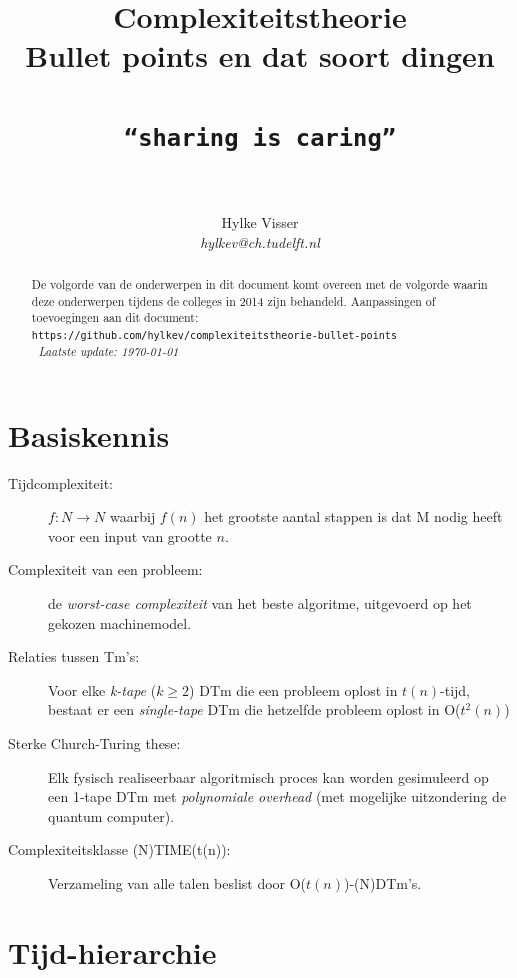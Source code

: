 \documentclass[]{article}
\begin{document}
\title{\textbf{Complexiteitstheorie} \\ Bullet points en dat soort dingen \\ ~ \\ \texttt{``sharing is caring''} \\ ~}
\author{Hylke Visser \\ \textit{hylkev@ch.tudelft.nl}}
\date{}
\maketitle

\renewcommand{\abstractname}{}

\begin{abstract}
De volgorde van de onderwerpen in dit document komt overeen met de volgorde waarin deze onderwerpen tijdens de colleges in 2014 zijn behandeld. Aanpassingen of toevoegingen aan dit document: \texttt{https://github.com/hylkev/complexiteitstheorie-bullet-points} \\ $~$ \hfill \textit{Laatste update: \today}
\end{abstract}

\section*{Basiskennis}

\begin{description}
\item[Tijdcomplexiteit:] $f : N \rightarrow N$ waarbij $f(n)$ het grootste aantal stappen is dat M nodig heeft voor een input van grootte $n$.
\item[Complexiteit van een probleem:] de \textit{worst-case complexiteit} van het beste algoritme, uitgevoerd op het gekozen machinemodel.
\item[Relaties tussen Tm's:] Voor elke \textit{k-tape} ($k \geq 2$) DTm die een probleem oplost in $t(n)$-tijd, bestaat er een \textit{single-tape} DTm die hetzelfde probleem oplost in O($t^2(n)$)
\item[Sterke Church-Turing these:] Elk fysisch realiseerbaar algoritmisch proces kan worden gesimuleerd op een 1-tape DTm met \textit{polynomiale overhead} (met mogelijke uitzondering de quantum computer).
\item[Complexiteitsklasse (N)TIME(t(n)):] Verzameling van alle talen beslist door O($t(n)$)-(N)DTm's.
\end{description}

\section*{Tijd-hierarchie}
\end{document}
